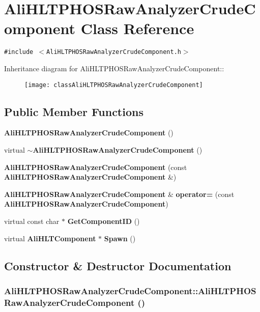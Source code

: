 \section{Ali\-HLTPHOSRaw\-Analyzer\-Crude\-Component Class Reference}
\label{classAliHLTPHOSRawAnalyzerCrudeComponent}
{\tt \#include $<$Ali\-HLTPHOSRaw\-Analyzer\-Crude\-Component.h$>$}

Inheritance diagram for Ali\-HLTPHOSRaw\-Analyzer\-Crude\-Component::\begin{figure}[H]
\begin{center}
\leavevmode
\texttt{[image: classAliHLTPHOSRawAnalyzerCrudeComponent]}
\end{center}
\end{figure}
\subsection*{Public Member Functions}
\begin{CompactItemize}
\item 
{\bf Ali\-HLTPHOSRaw\-Analyzer\-Crude\-Component} ()
\item 
virtual {\bf $\sim$Ali\-HLTPHOSRaw\-Analyzer\-Crude\-Component} ()
\item 
{\bf Ali\-HLTPHOSRaw\-Analyzer\-Crude\-Component} (const {\bf Ali\-HLTPHOSRaw\-Analyzer\-Crude\-Component} \&)
\item 
{\bf Ali\-HLTPHOSRaw\-Analyzer\-Crude\-Component} \& {\bf operator=} (const {\bf Ali\-HLTPHOSRaw\-Analyzer\-Crude\-Component})
\item 
virtual const char $\ast$ {\bf Get\-Component\-ID} ()
\item 
virtual {\bf Ali\-HLTComponent} $\ast$ {\bf Spawn} ()
\end{CompactItemize}


\subsection{Constructor \& Destructor Documentation}
\subsubsection{\setlength{\rightskip}{0pt plus 5cm}Ali\-HLTPHOSRaw\-Analyzer\-Crude\-Component::Ali\-HLTPHOSRaw\-Analyzer\-Crude\-Component ()}\label{classAliHLTPHOSRawAnalyzerCrudeComponent_a0}




